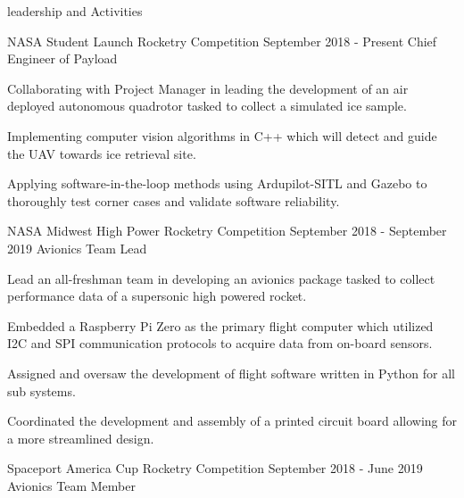 \documentclass{resume} %
\begin{document}
\begin{rSection} {leadership and Activities}

    \begin{rSubsection} {NASA Student Launch Rocketry Competition} {September 2018 - Present} {Chief Engineer of Payload}

        \item Collaborating with Project Manager in leading the development of an air deployed autonomous quadrotor tasked to collect a simulated ice sample.
        \item Implementing computer vision algorithms in C++ which will detect and guide the UAV towards ice retrieval site.
        \item Applying software-in-the-loop methods using Ardupilot-SITL and Gazebo to thoroughly test corner cases and validate software reliability.
        \item

    \end{rSubsection}



    \begin{rSubsection} {NASA Midwest High Power Rocketry Competition} {September 2018 - September 2019} {Avionics Team Lead}

        \item Lead an all-freshman team in developing an avionics package tasked to collect performance data of a supersonic high powered rocket.
        \item Embedded a Raspberry Pi Zero as the primary flight computer which utilized I2C and SPI communication protocols to acquire data from on-board sensors.
        \item Assigned and oversaw the development of flight software written in Python for all sub systems.
        \item Coordinated the development and assembly of a printed circuit board allowing for a more streamlined design.

    \end{rSubsection}


    \begin{rSubsection} {Spaceport America Cup Rocketry Competition} {September 2018 - June 2019} {Avionics Team Member}


\end{rSubsection}
\end{rSection}
\end{document}

